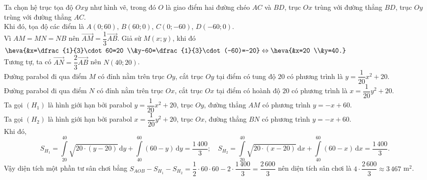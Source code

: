 \begin{ex}
{\begin{center}
		\end{center}
		Ta chọn hệ trục tọa độ $Oxy$ như hình vẽ, trong đó $O$ là giao điểm hai đường chéo $AC$ và $BD$, trục $Ox$ trùng với đường thẳng $BD$, trục $Oy$ trùng với đường thẳng $AC$.\\
		Khi đó, tọa độ các điểm là $A(0;60)$, $B(60;0)$, $C(0;-60)$, $D(-60;0)$.\\
		Vì $AM=MN=NB$ nên $\overrightarrow{AM}=\dfrac{1}{3}\overrightarrow{AB}$. Giả sử $M(x;y)$, khi đó $\heva{&x=\dfrac{1}{3}\cdot 60=20 \\&y-60=\dfrac{1}{3}\cdot(-60)=-20}\Leftrightarrow\heva{&x=20 \\&y=40.}$\\
		Tương tự, ta có $\overrightarrow{AN}=\dfrac{2}{3}\overrightarrow{AB}$ nên $N(40;20)$.\\
		Đường parabol đi qua điểm $M$ có đỉnh nằm trên trục $Oy$, cắt trục $Oy$ tại điểm có tung độ $20$ có phương trình là $y=\dfrac{1}{20}x^2+20$.\\
		Đường parabol đi qua điểm $N$ có đỉnh nằm trên trục $Ox$, cắt trục $Ox$ tại điểm có hoành độ $20$ có phương trình là $x=\dfrac{1}{20}y^2+20$.\\
		Ta gọi $(H_1)$ là hình giới hạn bởi parabol $y=\dfrac{1}{20}x^2+20$, trục $Oy$, đường thẳng $AM$ có phương trình $y=-x+60$.\\
		Ta gọi $(H_2)$ là hình giới hạn bởi parabol $x=\dfrac{1}{20}y^2+20$, trục $Ox$, đường thẳng $BN$ có phương trình $y=-x+60$.\\
		Khi đó, \[S_{H_1}=\displaystyle\int\limits_{20}^{40}\sqrt{20\cdot(y-20)}\mathrm{\,d}y+\int\limits_{40}^{60}(60-y)\mathrm{\,d}y=\dfrac{1\,400}{3};\quad S_{H_2}=\displaystyle\int\limits_{20}^{40}\sqrt{20\cdot(x-20)}\mathrm{\,d}x+\int\limits_{40}^{60}(60-x)\mathrm{\,d}x=\dfrac{1\,400}{3}.\]
		Vậy diện tích một phần tư sân chơi bẳng $S_{AOB}-S_{H_1}-S_{H_2}=\dfrac{1}{2}\cdot 60\cdot 60 -2\cdot\dfrac{1\,400}{3}=\dfrac{2\,600}{3}$ nên diện tích sân chơi là $4\cdot\dfrac{2\,600}{3}\approx 3\,467$ m$^2$.}
\end{ex}
